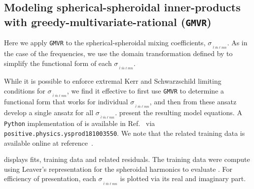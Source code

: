 \documentclass[twocolumn,aps,prd,floatfix,preprintnumbers,a4paper,nofootinbib,
superscriptaddress,10pt]{revtex4-1}
\def\LMlmn{_{\bar{\ell} \bar{m} \ell m n}}
\def\gmvr#1{greedy-multivariate-rational#1
  (\texttt{GMVR}#1)\gdef\gmvr{\texttt{GMVR}}}
\begin{document}
\subsection{Modeling spherical-spheroidal inner-products with \gmvr{}}
%
%
Here we apply \gmvr{} to the spherical-spheroidal mixing coefficients, $\sigma_{\LMlmn}$.
%
As in the case of the \qnm{} frequencies, we use the domain transformation defined by  to simplify the functional form of each $\sigma_{\LMlmn}$.
%
\par While it is possible to enforce extremal Kerr and Schwarzschild limiting conditions for $\sigma_{\LMlmn}$, we find it effective to first use \gmvr{} to determine a functional form that works for {individual} $\sigma_{\LMlmn}$, and then from these ansatz develop a single ansatz for all $\sigma_{\LMlmn}$.
%
 present the resulting model equations.
%
A \texttt{Python} implementation of  is available in Ref.~\cite{lionel_london_2018_1402516} via \texttt{positive.physics.ysprod181003550}.
%
We note that the related training data is available online at reference~\cite{ys_training_data}.
%
%
\par {} displays fits, training data and related residuals. The training data were compute using Leaver's representation for the spheroidal harmonics to evaluate .
%
For efficiency of presentation, each $\sigma_{\LMlmn}$ is plotted via its real and imaginary part.
%
\end{document}
